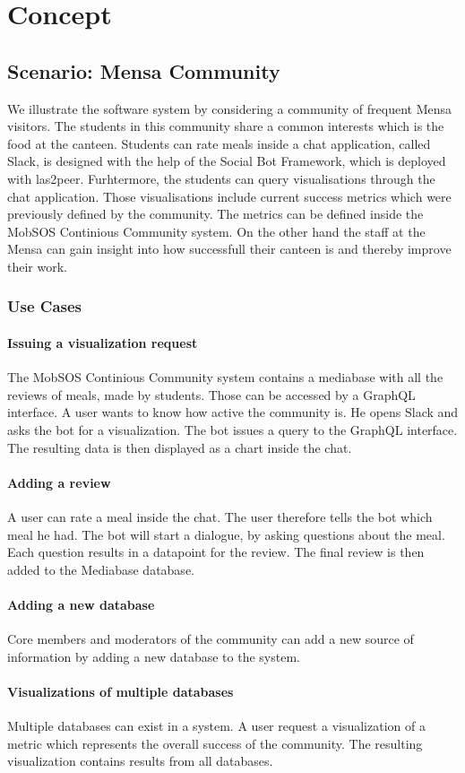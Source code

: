 \chapter{Concept}
\section{Scenario: Mensa Community}
We illustrate the software system by considering a community of frequent Mensa visitors. The students in this community share a common interests which is the food at the canteen. Students can rate meals inside a chat application, called Slack, is designed with the help of the Social Bot Framework, which is deployed with las2peer. Furhtermore, the students can query visualisations through the chat application. Those visualisations include current success metrics which were previously defined by the community. The metrics can be defined inside the MobSOS Continious Community system. On the other hand the staff at the Mensa can gain insight into how successfull their canteen is and thereby improve their work.

\subsection{Use Cases}

\subsubsection{Issuing a visualization request} The MobSOS Continious Community system contains a mediabase with all the reviews of meals, made by students. Those can be accessed by a GraphQL interface. A user wants to know how active the community is. He opens Slack and asks the bot for a visualization. The bot issues a query to the GraphQL interface. The resulting data is then displayed as a chart inside the chat.

\subsubsection{Adding a review} A user can rate a meal inside the chat. The user therefore tells the bot which meal he had. The bot will start a dialogue, by asking questions about the meal. Each question results in a datapoint for the review. The final review is then added to the Mediabase database.

\subsubsection{Adding a new database} Core members and moderators of the community can add a new source of information by adding a new database to the system.

\subsubsection{Visualizations of multiple databases} Multiple databases can exist in a system. A user request a visualization of a metric which represents the overall success of the community. The resulting visualization contains results from all databases.
